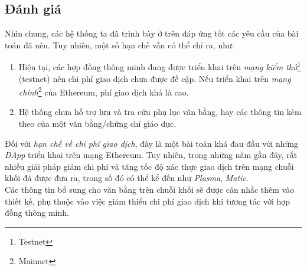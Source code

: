 \clearpage
\newpage
\subsection{Đánh giá}

Nhìn chung, các hệ thống ta đã trình bày ở trên đáp ứng tốt các yêu cầu của bài toán đã nêu. Tuy nhiên, một số hạn chế vẫn có thể chỉ ra, như:
\begin{enumerate}
    \item Hiện tại, các hợp đồng thông minh đang được triển khai trên \textit{mạng kiểm thử}\footnote{Testnet} (testnet) nên chi phí giao dịch chưa được đề cập. Nếu triển khai trên \textit{mạng chính}\footnote{Mainnet} của Ethereum, phí giao dịch khá là cao.\label{cons/transaction-fee}
    \item Hệ thống chưa hỗ trợ lưu và tra cứu phụ lục văn bằng, hay các thông tin kèm theo của một văn bằng/chứng chỉ giáo dục.
\end{enumerate}

Đối với \textit{hạn chế về chi phí giao dịch}, đây là một bài toán khá đau đầu với những \textit{DApp} triển khai trên mạng Ethereum. Tuy nhiên, trong những năm gần đây, rất nhiều giải pháp giảm chi phí và tăng tốc độ xác thực giao dịch trên mạng chuỗi khối đã được đưa ra, trong số đó có thể kể đến như \textit{Plasma}, \textit{Matic}.\\

Các thông tin bổ sung cho văn bằng trên chuỗi khối sẽ được cân nhắc thêm vào thiết kế, phụ thuộc vào việc giảm thiểu chi phí giao dịch khi tương tác với hợp đồng thông minh.
